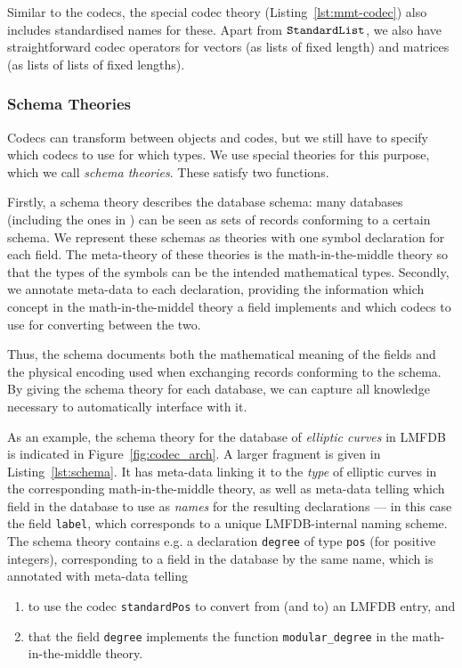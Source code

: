 Similar to the codecs, the special \MMT codec theory (Listing~\ref{lst:mmt-codec}) also includes standardised names for these.
Apart from $\standardList$, we also have straightforward codec operators for vectors (as lists of fixed length) and matrices (as lists of lists of fixed lengths).

\subsubsection{Schema Theories}

Codecs can transform between \MMT objects and codes, but we still have to specify which codecs to use for which types.
We use special theories for this purpose, which we call \emph{schema theories}.
These satisfy two functions.

Firstly, a schema theory describes the database schema: many databases (including the ones in \LMFDB) can be seen as sets of records conforming to a certain schema.
We represent these schemas as \MMT theories with one symbol declaration for each field.
The meta-theory of these theories is the math-in-the-middle theory so that the types of the symbols can be the intended mathematical types.
Secondly, we annotate meta-data to each declaration, providing the information which concept in the math-in-the-middel theory a field implements and which codecs to use for converting between the two.

Thus, the schema documents both the mathematical meaning of the fields and the physical encoding used when exchanging records conforming to the schema.
By giving the schema theory for each database, we can capture all knowledge necessary to automatically interface with it.



As an example, the schema theory for the database of \emph{elliptic curves} in LMFDB is indicated in Figure~\ref{fig:codec_arch}.
A larger fragment is given in Listing~\ref{lst:schema}. 
It has meta-data linking it to the \emph{type} of elliptic curves in the corresponding math-in-the-middle theory, as well as meta-data telling \MMT which field in the database to use as \emph{names} for the resulting \MMT declarations --- in this case the field \texttt{label}, which corresponds to a unique LMFDB-internal naming scheme. The schema theory contains e.g. a declaration \texttt{degree} of type \texttt{pos} (for positive integers), corresponding to a field in the database by the same name, which is annotated with meta-data telling \MMT
\begin{enumerate}
\item to use the codec \texttt{standardPos} to convert from (and to) an LMFDB entry, and
\item that the field \texttt{degree} implements the function \texttt{modular\_degree} in the math-in-the-middle theory.
\end{enumerate}

